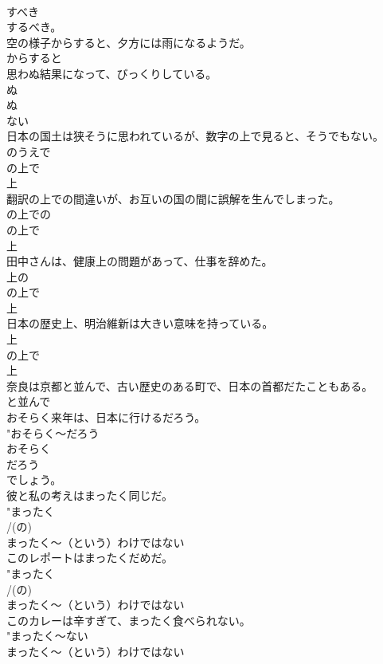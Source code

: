 \documentclass[8pt]{extreport}
\begin{document}
\begin{CJK}{UTF8}{min}
{{\\	すべき 
\\	するべき。
\\	空の様子からすると、夕方には雨になるようだ。	
\\	からすると 
\\	思わぬ結果になって、びっくりしている。	
\\	ぬ 
\\	ぬ 
\\	ない 
\\	日本の国土は狭そうに思われているが、数字の上で見ると、そうでもない。	
\\	のうえで 
\\	の上で 
\\	上 
\\	翻訳の上での間違いが、お互いの国の間に誤解を生んでしまった。	
\\	の上での 
\\	の上で 
\\	上 
\\	田中さんは、健康上の問題があって、仕事を辞めた。	
\\	上の 
\\	の上で 
\\	上 
\\	日本の歴史上、明治維新は大きい意味を持っている。	
\\	上 
\\	の上で 
\\	上 
\\	奈良は京都と並んで、古い歴史のある町で、日本の首都だたこともある。	
\\	と並んで 
\\	おそらく来年は、日本に行けるだろう。	
\\	"おそらく〜だろう 
\\	おそらく 
\\	だろう 
\\	でしょう。
\\	彼と私の考えはまったく同じだ。	
\\	"まったく 
\\	/(の)
\\	まったく〜（という）わけではない 
\\	このレポートはまったくだめだ。	
\\	"まったく 
\\	/(の)
\\	まったく〜（という）わけではない 
\\	このカレーは辛すぎて、まったく食べられない。	
\\	"まったく〜ない 
\\	まったく〜（という）わけではない 
}}
\end{CJK}
\end{document}
